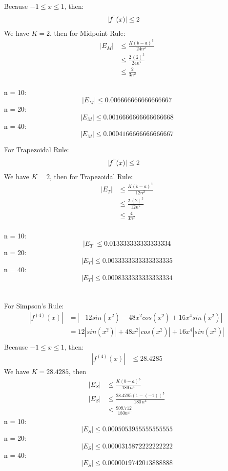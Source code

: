 \documentclass{article}
\begin{document}
    Because $-1 \leq x \leq 1$, then:
    \begin{align*}
        |f^{"}(x)| & \leq 2
    \end{align*}
    We have $K = 2$, then for Midpoint Rule:
    \begin{align*}
        |E_{M}| &\leq \frac{K(b-a)^{3}}{24n^2} \\
        &\leq \frac{2\,(2)^3}{24n^2} \\
        &\leq \frac{2}{3n^2}
    \end{align*} \\

    n = 10: \\
    $$ |E_{M}| \leq 0.006666666666666667 $$
    n = 20: \\
    $$ |E_{M}| \leq 0.0016666666666666668 $$
    n = 40: \\
    $$ |E_{M}| \leq 0.0004166666666666667 $$

    For Trapezoidal Rule:
    \begin{align*}
        |f^{"}(x)| & \leq 2
    \end{align*}
    We have $K = 2$, then for Trapezoidal Rule:
    \begin{align*}
        |E_{T}| &\leq \frac{K(b-a)^{3}}{12n^2} \\
        &\leq \frac{2\,(2)^3}{12n^2} \\
        &\leq \frac{4}{3n^2}
    \end{align*} \\

    n = 10: \\
    $$ |E_{T}| \leq 0.013333333333333334 $$
    n = 20: \\
    $$ |E_{T}| \leq 0.0033333333333333335 $$
    n = 40: \\
    $$ |E_{T}| \leq 0.0008333333333333334 $$ \\\\

    For Simpson's Rule:\\
    \begin{align*}
        |f^{(4)}(x)| &= |-12sin(x^2) - 48x^2cos(x^2) + 16x^4sin(x^2)| \\
        &= 12|sin(x^2)| + 48 x^2 |cos(x^2)| + 16 x^4 |sin(x^2)| \\
    \end{align*}
    Because $-1 \leq x \leq 1$, then:
    \begin{align*}
        |f^{(4)}(x)| & \leq 28.4285
    \end{align*}
    We have $ K = 28.4285$, then
    \begin{align*}
        |E_{S}| & \leq \frac{K(b-a)^5}{180\,n^4} \\
        |E_{S}| & \leq \frac{28.4285(1-(-1))^5}{180\,n^4} \\
        &\leq \frac{909.712}{180n^4}
    \end{align*}
    n = 10: \\
    $$ |E_{S}| \leq 0.0005053955555555555 $$
    n = 20: \\
    $$ |E_{S}| \leq 0.0000315872222222222 $$
    n = 40: \\
    $$ |E_{S}| \leq 0.0000019742013888888 $$ \\\\
\end{document}

